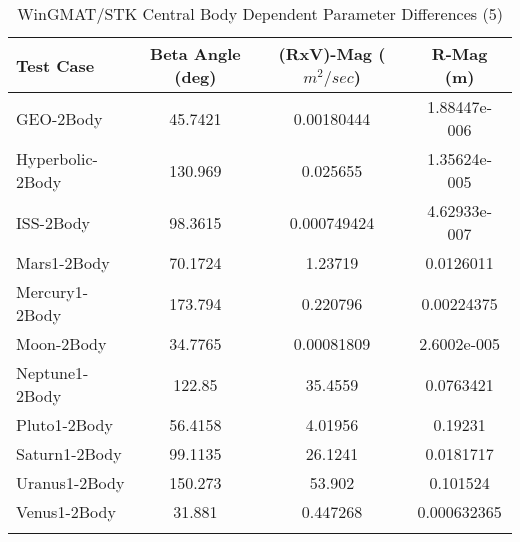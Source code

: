 \begin{table}[htbp!]
\centering
\caption{ WinGMAT/STK Central Body Dependent Parameter Differences (5)}
      \begin{tabular}{lccc}
      \hline\hline
          Test Case & Beta Angle (deg) & (RxV)-Mag ($m^2/sec$) & R-Mag (m) \\
         \hline
         GEO-2Body & 45.7421 & 0.00180444 & 1.88447e-006 \\
         Hyperbolic-2Body & 130.969 & 0.025655 & 1.35624e-005 \\
         ISS-2Body & 98.3615 & 0.000749424 & 4.62933e-007 \\
         Mars1-2Body & 70.1724 & 1.23719 & 0.0126011 \\
         Mercury1-2Body & 173.794 & 0.220796 & 0.00224375 \\
         Moon-2Body & 34.7765 & 0.00081809 & 2.6002e-005 \\
         Neptune1-2Body & 122.85 & 35.4559 & 0.0763421 \\
         Pluto1-2Body & 56.4158 & 4.01956 & 0.19231 \\
         Saturn1-2Body & 99.1135 & 26.1241 & 0.0181717 \\
         Uranus1-2Body & 150.273 & 53.902 & 0.101524 \\
         Venus1-2Body & 31.881 & 0.447268 & 0.000632365 \\
      \hline\hline
      \label{Table: WinGMAT-STK CB Parameters Set 5} 
\end{tabular}
\end{table}
